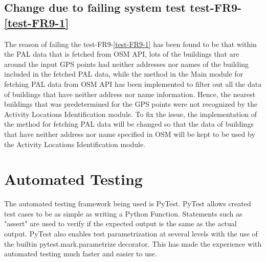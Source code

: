 \documentclass[12pt, titlepage]{article}
\begin{document}
\subsection{Change due to failing system test test-FR9-\ref{test-FR9-1}}
The reason of failing the test-FR9-\ref{test-FR9-1} has been found to be that within the PAL data that is fetched from OSM API, lots of the buildings that are around the input GPS points had neither addresses nor names of the building included in the fetched PAL data, while the method in the Main module for fetching PAL data from OSM API has been implemented to filter out all the data of buildings that have neither address nor name information. Hence, the nearest buildings that was predetermined for the GPS points were not recognized by the Activity Locations Identification module. To fix the issue, the implementation of the method for fetching PAL data will be changed so that the data of buildings that have neither address nor name specified in OSM will be kept to be used by the Activity Locations Identification module.

\section{Automated Testing}

The automated testing framework being used is PyTest. PyTest allows created test cases to be as simple as writing a Python Function. Statements such as "assert" are used to verify if the expected output is the same as the actual output. PyTest also enables test parametrization at several levels with the use of the builtin pytest.mark.parametrize decorator. This has made the experience with automated testing much faster and easier to use. 
		
\end{document}
